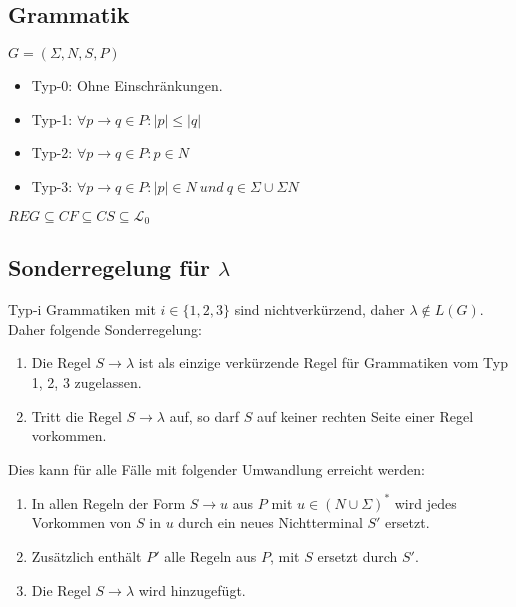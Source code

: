 \documentclass[9pt, a4paper]{article}
\begin{document}
\subsection{Grammatik}
$G = (\Sigma, N, S, P)$
\begin{itemize}
	\item Typ-0: Ohne Einschränkungen.
	\item Typ-1: $\forall p \rightarrow q \in P : |p| \leq |q|$ 
	\item Typ-2: $\forall p \rightarrow q \in P : p \in N$ 
	\item Typ-3: $\forall p \rightarrow q \in P : |p| \in N \ und\ q \in \Sigma \cup \Sigma N$ 
\end{itemize}
$REG \subseteq CF \subseteq CS \subseteq \mathcal{L}_0$
\subsection{Sonderregelung für $\lambda$}
Typ-i Grammatiken mit $i\in \{1, 2, 3\}$ sind nichtverkürzend, daher $\lambda \notin L(G)$. Daher folgende Sonderregelung:
\begin{enumerate}
	\item Die Regel $S \rightarrow \lambda$ ist als einzige verkürzende Regel für Grammatiken vom Typ 1, 2, 3 zugelassen.
	\item Tritt die Regel $S \rightarrow \lambda$ auf, so darf $S$ auf keiner rechten Seite einer Regel vorkommen.
\end{enumerate}
Dies kann für alle Fälle mit folgender Umwandlung erreicht werden:
\begin{enumerate}
	\item In allen Regeln der Form $S \rightarrow u$ aus $P$ mit $u \in (N \cup \Sigma)^*$ wird jedes Vorkommen von $S$ in $u$ durch ein neues Nichtterminal $S'$ ersetzt.
	\item Zusätzlich enthält $P'$ alle Regeln aus $P$, mit $S$ ersetzt durch $S'$.
	\item Die Regel $S \rightarrow \lambda$ wird hinzugefügt.
\end{enumerate}
\end{document}
